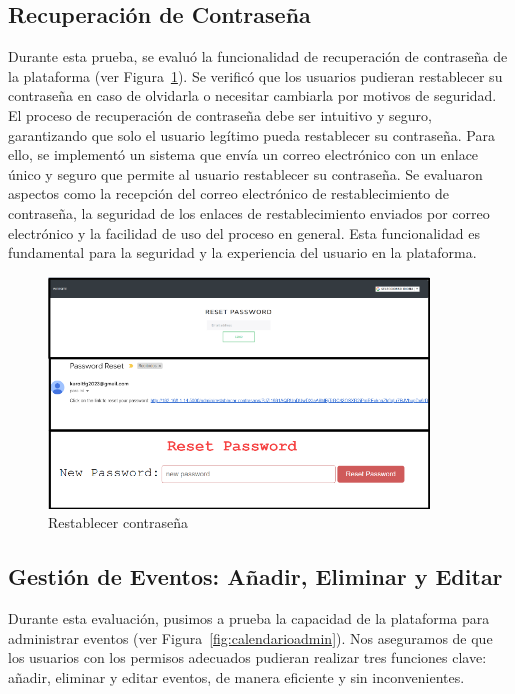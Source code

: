 \documentclass[a4paper, 12pt]{book}
\begin{document}
\subsection{Recuperación de Contraseña}
\label{sec:recuperacion-contraseña}
Durante esta prueba, se evaluó la funcionalidad de recuperación de contraseña de la plataforma (ver Figura~\ref{fig:contrasenarest}). Se verificó que los usuarios 
pudieran restablecer su contraseña en caso de olvidarla o necesitar cambiarla por motivos de seguridad. El proceso de recuperación de contraseña debe ser intuitivo 
y seguro, garantizando que solo el usuario legítimo pueda restablecer su contraseña. Para ello, se implementó un sistema que envía un correo electrónico con un enlace 
único y seguro que permite al usuario restablecer su contraseña. Se evaluaron aspectos como la recepción del correo electrónico de restablecimiento de contraseña, 
la seguridad de los enlaces de restablecimiento enviados por correo electrónico y la facilidad de uso del proceso en general. Esta funcionalidad es fundamental 
para la seguridad y la experiencia del usuario en la plataforma.
\begin{figure}
  \centering
  \includegraphics[width=0.9\textwidth]{img/password.png}
  \caption{Restablecer contraseña}
  \label{fig:contrasenarest}
\end{figure}

\subsection{Gestión de Eventos: Añadir, Eliminar y Editar}
\label{sec:add-delete-edit-events}

Durante esta evaluación, pusimos a prueba la capacidad de la plataforma para administrar eventos (ver Figura~\ref{fig:calendarioadmin}). Nos aseguramos de que los 
usuarios con los permisos adecuados pudieran realizar tres funciones clave: añadir, eliminar y editar eventos, de manera eficiente y sin inconvenientes. 
\end{document}
